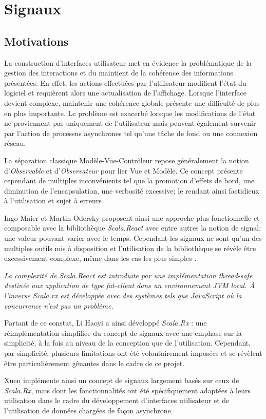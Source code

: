\chapter{Signaux}

\section{Motivations}

La construction d'interfaces utilisateur met en évidence la problématique de la gestion des interactions et du maintient de la cohérence des informations présentées. En effet, les actions effectuées par l'utilisateur modifient l'état du logiciel et requièrent alors une actualisation de l'affichage. Lorsque l'interface devient complexe, maintenir une cohérence globale présente une difficulté de plus en plus importante. Le problème est exacerbé lorsque les modifications de l'état ne proviennent pas uniquement de l'utilisateur mais peuvent également survenir par l'action de processus asynchrones tel qu'une tâche de fond ou une connexion réseau.

La séparation classique Modèle-Vue-Contrôleur repose généralement la notion d'\emph{Observable} et d'\emph{Observateur} pour lier Vue et Modèle. Ce concept présente cependant de multiples inconvénients tel que la promotion d'effets de bord, une diminution de l'encapsulation, une verbosité excessive; le rendant ainsi fastidieux à l'utilisation et sujet à erreurs \cite{odersky2012}.

Ingo Maier et Martin Odersky proposent ainsi une approche plus fonctionnelle et composable avec la bibliothèque \emph{Scala.React} \cite{scala-react} avec entre autres la notion de signal: une valeur pouvant varier avec le temps. Cependant les signaux ne sont qu'un des multiples outils mis à disposition et l'utilisation de la bibliothèque se révèle être excessivement complexe, même dans les cas les plus simples \cite[\small Related~Work]{scala.rx}.

\textit{La complexité de Scala.React est introduite par une implémentation thread-safe destinée aux application de type fat-client dans un environnement JVM local. À l'inverse Scala.rx est développée avec des systèmes tels que JavaScript où la concurrence n'est pas un problème.}

Partant de ce constat, Li Haoyi a ainsi développé \emph{Scala.Rx} \cite{scala.rx}: une réimplémentation simplifiée du concept de signaux avec une emphase sur la simplicité, à la fois au niveau de la conception que de l'utilisation. Cependant, par simplicité, plusieurs limitations ont été volontairement imposées et se révèlent être particulièrement gênantes dans le cadre de ce projet.

Xuen implémente ainsi un concept de signaux largement basés sur ceux de \emph{Scala.Rx}, mais dont les fonctionnalités ont été spécifiquement adaptées à leurs utilisation dans le cadre du développement d'interfaces utilisateur et de l'utilisation de données chargées de façon asynchrone.






